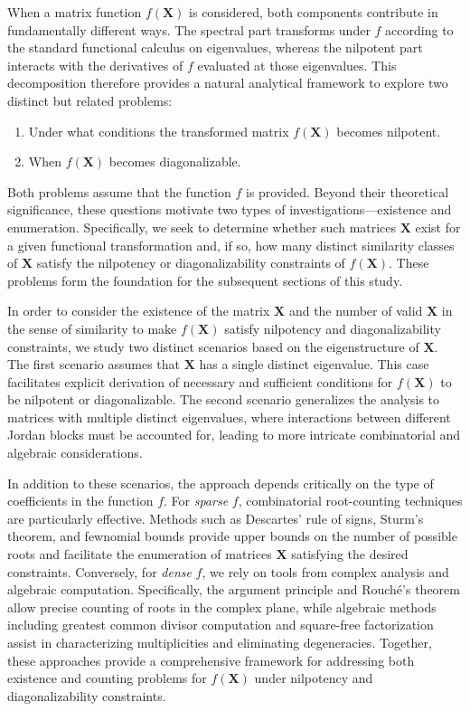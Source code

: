 \documentclass[11pt]{article}
\begin{document}
When a matrix function $f(\bm{X})$ is considered, both components contribute in fundamentally different ways. The spectral part transforms under $f$ according to the standard functional calculus on eigenvalues, whereas the nilpotent part interacts with the derivatives of $f$ evaluated at those eigenvalues. This decomposition therefore provides a natural analytical framework to explore two distinct but related problems:  
%
\begin{enumerate}[label=(\arabic*)]
    \item Under what conditions the transformed matrix $f(\bm{X})$ becomes nilpotent.
    \item When $f(\bm{X})$ becomes diagonalizable.
\end{enumerate}
%
Both problems assume that the function $f$ is provided. Beyond their theoretical significance, these questions motivate two types of investigations—existence and enumeration. Specifically, we seek to determine whether such matrices $\bm{X}$ exist for a given functional transformation and, if so, how many distinct similarity classes of $\bm{X}$ satisfy the nilpotency or diagonalizability constraints of $f(\bm{X})$. These problems form the foundation for the subsequent sections of this study.



In order to consider the existence of the matrix $\bm{X}$ and the number of valid $\bm{X}$ in the sense of similarity to make $f(\bm{X})$ satisfy nilpotency and diagonalizability constraints, we study two distinct scenarios based on the eigenstructure of $\bm{X}$. The first scenario assumes that $\bm{X}$ has a single distinct eigenvalue. This case facilitates explicit derivation of necessary and sufficient conditions for $f(\bm{X})$ to be nilpotent or diagonalizable. The second scenario generalizes the analysis to matrices with multiple distinct eigenvalues, where interactions between different Jordan blocks must be accounted for, leading to more intricate combinatorial and algebraic considerations.

In addition to these scenarios, the approach depends critically on the type of coefficients in the function $f$. For \emph{sparse} $f$, combinatorial root-counting techniques are particularly effective. Methods such as Descartes' rule of signs, Sturm's theorem, and fewnomial bounds provide upper bounds on the number of possible roots and facilitate the enumeration of matrices $\bm{X}$ satisfying the desired constraints. Conversely, for \emph{dense} $f$, we rely on tools from complex analysis and algebraic computation. Specifically, the argument principle and Rouché's theorem allow precise counting of roots in the complex plane, while algebraic methods including greatest common divisor computation and square-free factorization assist in characterizing multiplicities and eliminating degeneracies. Together, these approaches provide a comprehensive framework for addressing both existence and counting problems for $f(\bm{X})$ under nilpotency and diagonalizability constraints.
\end{document}

